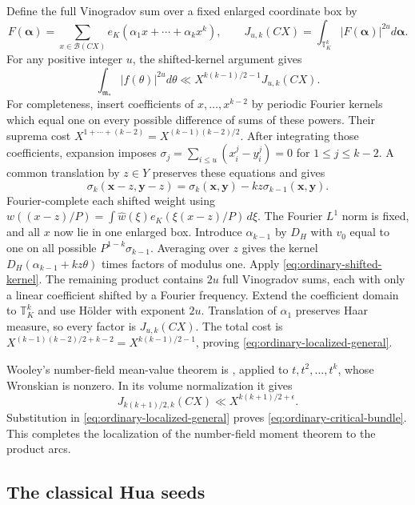 \documentclass[11pt]{amsart}
\theoremstyle{definition}
\numberwithin{equation}{section}
\begin{document}
Define the full Vinogradov sum over a fixed enlarged coordinate box by
\[
 F(\boldsymbol\alpha)=\sum_{x\in\mathcal B(CX)}
    e_K(\alpha_1x+\cdots+\alpha_kx^k),\qquad
 J_{u,k}(CX)=\int_{\mathbb T_K^k}|F(\boldsymbol\alpha)|^{2u}
                 d\boldsymbol\alpha.
\]
For any positive integer $u$, the shifted-kernel argument gives
\begin{equation}\label{eq:ordinary-localized-general}
 \int_{\mathfrak m_*}|f(\theta)|^{2u}d\theta
       \ll X^{k(k-1)/2-1}J_{u,k}(CX).
\end{equation}
For completeness, insert coefficients of $x,\ldots,x^{k-2}$ by periodic
Fourier kernels which equal one on every possible difference of sums of these
powers.  Their suprema cost
$X^{1+\cdots+(k-2)}=X^{(k-1)(k-2)/2}$.
After integrating those coefficients, expansion imposes
$\sigma_j=\sum_{i\le u}(x_i^j-y_i^j)=0$ for $1\le j\le k-2$.
A common translation by $z\in Y$ preserves these equations and gives
\[
 \sigma_k(\mathbf x-z,\mathbf y-z)
      =\sigma_k(\mathbf x,\mathbf y)-kz\sigma_{k-1}(\mathbf x,\mathbf y).
\]
Fourier-complete each shifted weight using
$w((x-z)/P)=\int\widehat w(\xi)e_K(\xi(x-z)/P)\,d\xi$.
The Fourier $L^1$ norm is fixed, and all $x$ now lie in one enlarged box.
Introduce $\alpha_{k-1}$ by $D_H$ with $v_0$ equal to one on all possible
$P^{1-k}\sigma_{k-1}$.
Averaging over $z$ gives the kernel
$D_H(\alpha_{k-1}+kz\theta)$ times factors of modulus one.
Apply \eqref{eq:ordinary-shifted-kernel}.
The remaining product contains $2u$ full Vinogradov sums, each with only a
linear coefficient shifted by a Fourier frequency.
Extend the coefficient domain to $\mathbb T_K^k$ and use H\"older with
exponent $2u$.  Translation of $\alpha_1$ preserves Haar measure, so every
factor is $J_{u,k}(CX)$.
The total cost is
$X^{(k-1)(k-2)/2+k-2}=X^{k(k-1)/2-1}$, proving
\eqref{eq:ordinary-localized-general}.

Wooley's number-field mean-value theorem is
\cite[Theorem~15.1]{Wooley2019}, applied to $t,t^2,\ldots,t^k$,
whose Wronskian is nonzero.  In its volume normalization it gives
\[
 J_{k(k+1)/2,k}(CX)\ll X^{k(k+1)/2+\epsilon}.
\]
Substitution in \eqref{eq:ordinary-localized-general} proves
\eqref{eq:ordinary-critical-bundle}.  This completes the localization of the number-field moment theorem to the product arcs.

\subsection{The classical Hua seeds}
\end{document}
